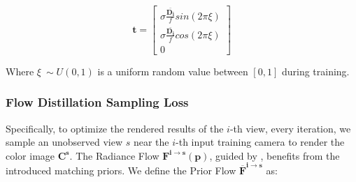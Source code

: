 \begin{equation}
    \bm{t} = \begin{bmatrix}
        \sigma  \frac{\bar{\bm{D_i}}}{f} sin(2 \pi \xi ) \\
        \sigma \frac{\bar{\bm{D_i}}}{f} cos(2 \pi \xi ) \\
        0
    \end{bmatrix}
\end{equation}

Where $\xi ~\sim  U(0, 1) $ is a uniform 
random value between $[0, 1]$ during training.





\subsubsection{Flow Distillation Sampling Loss}
\label{sec:method:subsubsec:fds}
%
Specifically, to optimize the rendered results of the $i$-th view, 
every iteration, we sample an unobserved view $s$ near the $i$-th input training camera 
to render the color image $\bm{C^s}$. The Radiance Flow $\bm{F^{i\rightarrow s}(p)}$,
guided by , 
benefits from the introduced matching priors. 
%
We define the Prior Flow $\bm{\overline{F}^{i\rightarrow s}}$ as:

